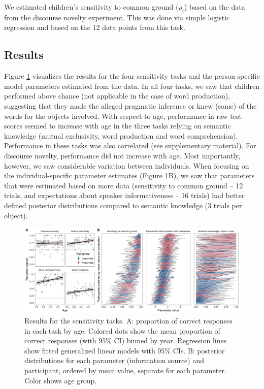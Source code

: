 \documentclass[
  man,floatsintext]{apa6}
\begin{document}
We estimated children's sensitivity to common ground (\(\rho_i\)) based on the data from the discourse novelty experiment. This was done via simple logistic regression and based on the 12 data points from this task.

\hypertarget{results}{%
\subsection{Results}\label{results}}

Figure \ref{fig:fig2} visualizes the results for the four sensitivity tasks and the person specific model parameters estimated from the data. In all four tasks, we saw that children performed above chance (not applicable in the case of word production), suggesting that they made the alleged pragmatic inference or knew (some) of the words for the objects involved. With respect to age, performance in raw test scores seemed to increase with age in the three tasks relying on semantic knowledge (mutual exclusivity, word production and word comprehension). Performance in these tasks was also correlated (see supplementary material). For discourse novelty, performance did not increase with age. Most importantly, however, we saw considerable variation between individuals. When focusing on the individual-specific parameter estimates (Figure \ref{fig:fig2}B), we saw that parameters that were estimated based on more data (sensitivity to common ground -- 12 trials, and expectations about speaker informativeness -- 16 trials) had better defined posterior distributions compared to semantic knowledge (3 trials per object).

\begin{figure}
\includegraphics[width=1\linewidth]{./figures/fig2_1} \caption{Results for the sensitivity tasks. A: proportion of correct responses in each task by age. Colored dots show the mean proportion of correct responses (with 95\% CI) binned by year. Regression lines show fitted generalized linear models with 95\% CIs. B: posterior distributions for each parameter (information source) and participant, ordered by mean value, separate for each parameter. Color shows age group.}\label{fig:fig2}
\end{figure}
\end{document}
